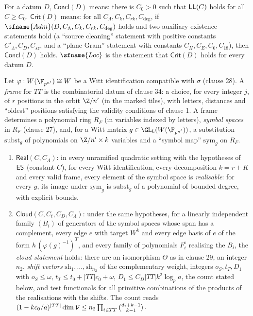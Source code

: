 \begin{definition}\label{pf:linkG:criterion}
For a datum $D$, $\mathsf{Concl}(D)$ means: there is $C_0>0$ such that $\mathsf{LL}(C)$ holds for all $C\ge C_0$.
$\mathsf{Crit}(D)$ means: for all $C_\Lambda,C_k,C_{rk},C_{\deg}$, if
$\sfname{Adm}(D,C_\Lambda,C_k,C_{rk},C_{\deg})$ holds and two auxiliary existence statements hold (a ``source
cleaning'' statement with positive constants $C'_\Lambda,C_D,C_{sz}$, and a ``plane Gram'' statement with constants
$C_H,C_E,C_6,C_{18}$), then $\mathsf{Concl}(D)$ holds. $\sfname{Loc}$ is the statement that
$\mathsf{Crit}(D)$ holds for every datum $D$.
\end{definition}

\begin{definition}\label{pf:linkG:cloud}
Let $\varphi:W(\F_{p^{n'}})\cong W$ be a Witt identification compatible with $\sigma$ (clause 28). A \emph{frame} for
$TT$ is the combinatorial datum of clause 34: a choice, for every integer $j$, of $r$ positions in the orbit $\Z/n'$ (in
the marked tiles), with letters, distances and ``oldest'' positions satisfying the validity conditions of clause 1. A
frame determines a polynomial ring $R_F$ (in variables indexed by letters), \emph{symbol spaces} in $R_F$ (clause 27),
and, for a Witt matrix $g\in\GL_k(W(\F_{p^{n'}}))$, a substitution $\mathrm{subst}_g$ of polynomials on $\Z/n'\times k$
variables and a ``symbol map'' $\mathrm{sym}_g$ on $R_F$.
\begin{enumerate}[label=(\alph*)]
\item $\mathsf{Real}(C,C_\Lambda)$: in every unramified quadratic setting with the hypotheses of
$\mathsf{ES}$ (constant $C$), for every Witt identification, every decomposition $k=r+K$ and every valid frame, every
element of the symbol space is \emph{realisable}: for every $g$, its image under $\mathrm{sym}_g$ is
$\mathrm{subst}_g$ of a polynomial of bounded degree, with explicit bounds.
\item $\mathsf{Cloud}(C,C_t,C_D,C_\Lambda)$: under the same hypotheses, for a linearly independent family $(B_i)$
of generators of the symbol spaces whose span has a complement, every edge $e$ with target $W^k$ and every edge basis of
$e$ of the form $h\,(\varphi(g)^{-1})^{T}$, and every family of polynomials $F^{\mathrm s}_i$ realising the $B_i$, the
\emph{cloud statement} holds: there are an isomorphism $\Theta$ as in clause 29, an integer $n_2$, \emph{shift vectors}
$\mathrm{sh}_1,\dots,\mathrm{sh}_{n_2}$ of the complementary weight, integers $o_S,t_T,D_1$ with
$o_S\le\omega$, $t_T\le t_0+|TT|c_0+\omega$, $D_1\le C_D|TT|k^2\log_pa$, the count stated below, and test functionals for all primitive
combinations of the products of the realisations with the shifts. The count reads
$(1-kc_0/a)^{|TT|}\dim\mathcal V\le n_2\prod_{t\in TT}\binom{d_t+k-1}{k-1}$.
\end{enumerate}
\end{definition}

